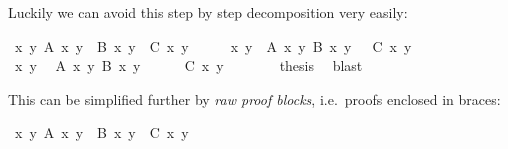 \begin{isabellebody}
\begin{isamarkuptext}
Luckily we can avoid this step by step decomposition very easily:%
\end{isamarkuptext}%
\isamarkuptrue%
\isamarkupfalse%
\ {}{}x\ y{}\ A\ x\ y\ {}\ B\ x\ y\ {}\ C\ x\ y{}\isanewline
%
\isadelimproof
%
\endisadelimproof
%
\isatagproof
{}\isamarkupfalse%
\ {}\isanewline
\ \ \isamarkupfalse%
\ {}{}x\ y{}\ {}\ A\ x\ y{}\ B\ x\ y\ {}\ {}\ C\ x\ y{}\isanewline
\ \ \isamarkupfalse%
\ {}\isanewline
\ \ \ \ \isamarkupfalse%
\ x\ y\ \isamarkupfalse%
\ {}A\ x\ y{}\ {}B\ x\ y{}\isanewline
\ \ \ \ \isamarkupfalse%
\ {}C\ x\ y{}\ \isamarkupfalse%
\isanewline
\ \ \isamarkupfalse%
\isanewline
\ \ \isamarkupfalse%
\ {}thesis\ \isamarkupfalse%
\ blast\isanewline
{}\isamarkupfalse%
%
\endisatagproof
{\isafoldproof}%
%
\isadelimproof
%
\endisadelimproof
%
\begin{isamarkuptext}%
\noindent
This can be simplified further by \emph{raw proof blocks}, i.e.\
proofs enclosed in braces:%
\end{isamarkuptext}%
\isamarkuptrue%
\isamarkupfalse%
\ {}{}x\ y{}\ A\ x\ y\ {}\ B\ x\ y\ {}\ C\ x\ y{}\isanewline
%
\isadelimproof
%
\endisadelimproof
%
\isatagproof
{}\isamarkupfalse%

\end{isabellebody}
